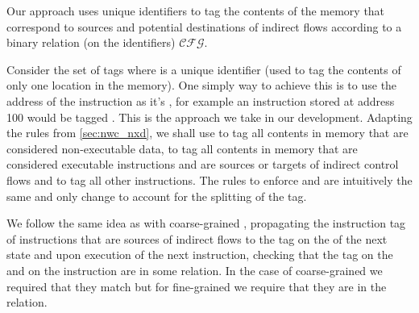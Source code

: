 

Our approach uses unique identifiers to tag the contents of the memory that
correspond to sources and potential destinations of indirect flows according to
a binary relation (on the identifiers) $\mathcal{CFG}$.

Consider the set of tags 
where \id is a unique identifier (\IE used to tag the contents of only
one location in the memory). One simply way to achieve this is to use
the address of the instruction as it's \id, for example an instruction
stored at address 100 would be tagged . This is the
approach we take in our development. Adapting the rules from
\ref{sec:nwc_nxd}, we shall use \DATAname to tag all contents in
memory that are considered non-executable data,  to tag
all contents in memory that are considered executable instructions and
are sources or targets of indirect control flows and \INSTR{$\bot$} to
tag all other instructions. The rules to enforce \NWC and \NXD are
intuitively the same and only change to account for the splitting of
the \INSTRname tag.


We follow the same idea as with coarse-grained \CFI, propagating the
instruction tag of instructions that are sources of indirect flows to
the tag on the \pc of the next state and upon execution of the next
instruction, checking that the tag on the \pc and on the instruction
are in some relation. In the case of coarse-grained \CFI we required
that they match but for fine-grained \CFI we require that they are in
the \CFG relation.

